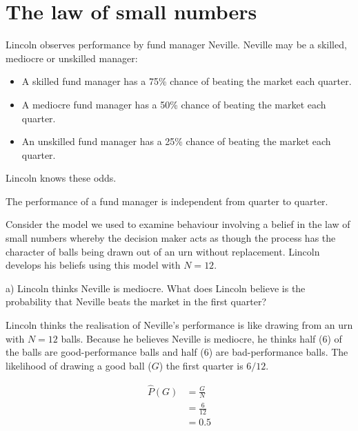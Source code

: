 \documentclass[
  letterpaper,
  DIV=11,
  numbers=noendperiod]{scrreprt}
\begin{document}
\hypertarget{the-law-of-small-numbers-1}{%
\section{The law of small numbers}\label{the-law-of-small-numbers-1}}

Lincoln observes performance by fund manager Neville. Neville may be a
skilled, mediocre or unskilled manager:

\begin{itemize}
\item
  A skilled fund manager has a 75\% chance of beating the market each
  quarter.
\item
  A mediocre fund manager has a 50\% chance of beating the market each
  quarter.
\item
  An unskilled fund manager has a 25\% chance of beating the market each
  quarter.
\end{itemize}

Lincoln knows these odds.

The performance of a fund manager is independent from quarter to
quarter.

Consider the model we used to examine behaviour involving a belief in
the law of small numbers whereby the decision maker acts as though the
process has the character of balls being drawn out of an urn without
replacement. Lincoln develops his beliefs using this model with
\(N = 12\).

a) Lincoln thinks Neville is mediocre. What does Lincoln believe is the
probability that Neville beats the market in the first quarter?

\begin{tcolorbox}[enhanced jigsaw, title=\textcolor{quarto-callout-tip-color}{\faLightbulb}\hspace{0.5em}{Answer}, toprule=.15mm, colback=white, breakable, titlerule=0mm, colframe=quarto-callout-tip-color-frame, coltitle=black, opacityback=0, rightrule=.15mm, colbacktitle=quarto-callout-tip-color!10!white, bottomtitle=1mm, opacitybacktitle=0.6, arc=.35mm, bottomrule=.15mm, toptitle=1mm, leftrule=.75mm, left=2mm]

Lincoln thinks the realisation of Neville's performance is like drawing
from an urn with \(N=12\) balls. Because he believes Neville is
mediocre, he thinks half (6) of the balls are good-performance balls and
half (6) are bad-performance balls. The likelihood of drawing a good
ball (\(G\)) the first quarter is \(6/12\).

\begin{align*}
\hat P(G)&=\frac{G}{N} \\
&=\frac{6}{12} \\
&=0.5
\end{align*}

\end{tcolorbox}
\end{document}
